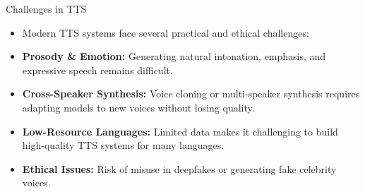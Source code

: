 \begin{frame}{Challenges in TTS}
\begin{itemize}
    \item Modern TTS systems face several practical and ethical challenges:

    \item \textbf{Prosody \& Emotion:}
    Generating natural intonation, emphasis, and expressive speech remains difficult.

    \item \textbf{Cross-Speaker Synthesis:}
    Voice cloning or multi-speaker synthesis requires adapting models to new voices without losing quality.

    \item \textbf{Low-Resource Languages:}
    Limited data makes it challenging to build high-quality TTS systems for many languages.

    \item \textbf{Ethical Issues:}
    Risk of misuse in deepfakes or generating fake celebrity voices.
\end{itemize}
\end{frame}
